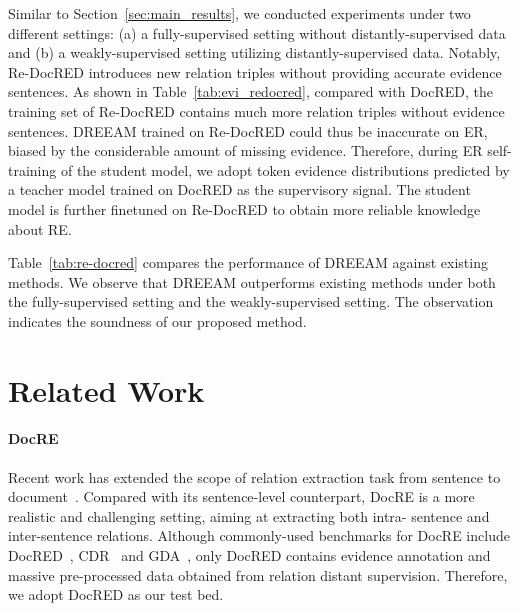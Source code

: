 \documentclass[11pt]{article}
\begin{document}
Similar to Section~\ref{sec:main_results}, we conducted experiments under two different settings:
(a) a fully-supervised setting without distantly-supervised data and (b) a weakly-supervised setting utilizing distantly-supervised data.
Notably, Re-DocRED introduces new relation triples without providing accurate evidence sentences.
As shown in Table~\ref{tab:evi_redocred}, compared with DocRED, the training set of Re-DocRED contains much more relation triples without evidence sentences.
DREEAM trained on Re-DocRED could thus be inaccurate on ER, biased by the considerable amount of missing evidence.
Therefore, during ER self-training of the student model, we adopt token evidence distributions predicted by a teacher model trained on DocRED as the supervisory signal.
The student model is further finetuned on Re-DocRED to obtain more reliable knowledge about RE. 

Table~\ref{tab:re-docred} compares the performance of DREEAM against existing methods.
We observe that DREEAM outperforms existing methods under both the fully-supervised setting and the weakly-supervised setting.
The observation indicates the soundness of our proposed method.

\section{Related Work}

\paragraph{DocRE} Recent work has extended the scope of relation extraction task from sentence to document~\cite{peng-etal-2017-cross,quirk-poon-2017-distant,yao-etal-2019-docred}. 
Compared with its sentence-level counterpart, DocRE is a more realistic and challenging setting, aiming at extracting both intra- sentence and inter-sentence relations.
Although commonly-used benchmarks for DocRE include DocRED~\cite{yao-etal-2021-adapt}, CDR~\cite{li2016CDR} and GDA~\cite{wu2019GDA}, only DocRED contains evidence annotation and massive pre-processed data obtained from relation distant supervision.
Therefore, we adopt DocRED as our test bed.
\end{document}
